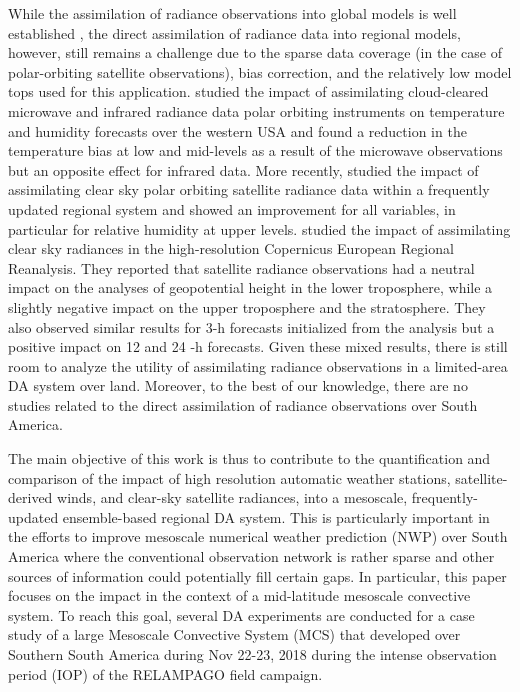 \documentclass[final,5p,times,twocolumn,authoryear]{elsarticle} %
\begin{document}
While the assimilation of radiance observations into global models is well established \citep{eyre2020}, the direct assimilation of radiance data into regional models, however, still remains a challenge due to the sparse data coverage (in the case of polar-orbiting satellite observations), bias correction, and the relatively low model tops used for this application. \citet{bao2015} studied the impact of assimilating cloud-cleared microwave and infrared radiance data polar orbiting instruments on temperature and humidity forecasts over the western USA and found a reduction in the temperature bias at low and mid-levels as a result of the microwave observations but an opposite effect for infrared data. More recently, \citet{zhu2019} studied the impact of assimilating clear sky polar orbiting satellite radiance data within a frequently updated regional system and showed an improvement for all variables, in particular for relative humidity at upper levels. \citet{wang2021} studied the impact of assimilating clear sky radiances in the high-resolution Copernicus European Regional Reanalysis. They reported that satellite radiance observations had a neutral impact on the analyses of geopotential height in the lower troposphere, while a slightly negative impact on the upper troposphere and the stratosphere. They also observed similar results for 3-h forecasts initialized from the analysis but a positive impact on 12 and 24 -h forecasts. Given these mixed results, there is still room to analyze the utility of assimilating radiance observations in a limited-area DA system over land. Moreover, to the best of our knowledge, there are no studies related to the direct assimilation of radiance observations over South America.

The main objective of this work is thus to contribute to the quantification and comparison of the impact of high resolution automatic weather stations, satellite-derived winds, and clear-sky satellite radiances, into a mesoscale, frequently-updated ensemble-based regional DA system. This is particularly important in the efforts to improve mesoscale numerical weather prediction (NWP) over South America where the conventional observation network is rather sparse and other sources of information could potentially fill certain gaps. In particular, this paper focuses on the impact in the context of a mid-latitude mesoscale convective system. To reach this goal, several DA experiments are conducted for a case study of a large Mesoscale Convective System (MCS) that developed over Southern South America during Nov 22-23, 2018 during the intense observation period (IOP) of the RELAMPAGO field campaign.
\end{document}

